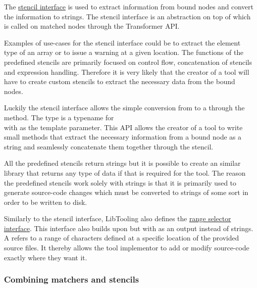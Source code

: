 The \href{https://github.com/llvm/llvm-project/blob/main/clang/include/clang/Tooling/Transformer/Stencil.h}{stencil interface} is used to extract information from bound nodes and convert the information to strings.  The stencil interface is an abstraction on top of  which is called on matched nodes through the Transformer API. 

Examples of use-cases for the stencil interface could be to extract the element type of an array or to issue a warning at a given location. The functions of the predefined stencils are primarily focused on control flow, concatenation of stencils and expression handling. Therefore it is very likely that the creator of a tool will have to create custom stencils to extract the necessary data from the bound nodes.

Luckily the stencil interface allows the simple conversion from  to a  through the  method. The  type is a typename for \\  with  as the template parameter. This API allows the creator of a tool to write small methods that extract the necessary information from a bound node as a string and seamlessly concatenate them together through the  stencil.

All the predefined stencils return strings but it is possible to create an similar library that returns any type of data if that is required for the tool. The reason the predefined stencils work solely with strings is that it is primarily used to generate source-code changes which must be converted to strings of some sort in order to be written to disk. 

Similarly to the stencil interface, LibTooling also defines the \href{https://github.com/llvm/llvm-project/blob/main/clang/include/clang/Tooling/Transformer/RangeSelector.h}{range selector interface}.
This interface also builds upon  but with  as an output instead of strings. A  refers to a range of characters defined at a specific location of the provided source files. It thereby allows the tool implementor to add or modify source-code exactly where they want it.

\subsubsection*{Combining matchers and stencils}

